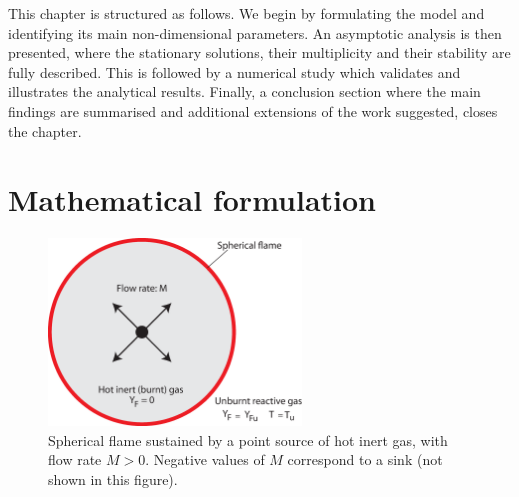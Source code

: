 This chapter is structured as follows. We begin by formulating the model  and identifying its main non-dimensional parameters.  An asymptotic analysis is then presented, where the  stationary solutions, their multiplicity and their stability  are fully described. This is  followed  by a numerical study  which validates and illustrates the analytical
results.  Finally, a conclusion section where the main findings are summarised and  additional extensions of the work  suggested, closes the chapter.

\section{Mathematical formulation}\label{sec:background:math}

\begin{figure}[]
 \centering
\includegraphics[width=0.6\textwidth]{Configuration.eps}
\caption{ Spherical flame sustained by a point source
of hot inert gas, with flow rate $M>0$. Negative values of $M$
correspond to a sink (not shown in this figure).}
\label{Configuration}
\end{figure}

